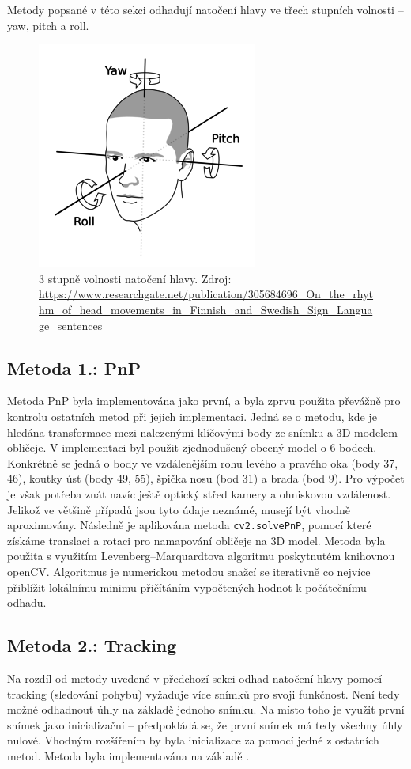 \documentclass[12pt,a4paper,titlepage,final]{report}
\begin{document}
Metody popsané v této sekci odhadují natočení hlavy ve třech stupních volnosti -- yaw, pitch a roll. 

\begin{figure}[H]
    \centering
    \includegraphics[scale=2]{images/yaw_pitch_roll.png}
    \caption{3 stupně volnosti natočení hlavy. Zdroj: \url{https://www.researchgate.net/publication/305684696_On_the_rhythm_of_head_movements_in_Finnish_and_Swedish_Sign_Language_sentences}}
    \label{fig:yaw_pitch_roll}
\end{figure}

\subsection{Metoda 1.: PnP}
Metoda PnP byla implementována jako první, a byla zprvu použita převážně pro kontrolu ostatních metod při jejich implementaci. Jedná se o metodu, kde je hledána transformace mezi nalezenými klíčovými body ze snímku a 3D modelem obličeje. V implementaci byl použit zjednodušený obecný model o 6 bodech. Konkrétně se jedná o body ve vzdálenějším rohu levého a pravého oka (body 37, 46), koutky úst (body 49, 55), špička nosu (bod 31) a brada (bod 9). Pro výpočet je však potřeba znát navíc ještě optický střed kamery a ohniskovou vzdálenost. Jelikož ve většině případů jsou tyto údaje neznámé, musejí být vhodně aproximovány. Následně je aplikována metoda \texttt{cv2.solvePnP}, pomocí které získáme translaci a rotaci pro namapování obličeje na 3D model. Metoda byla použita s využitím Levenberg–Marquardtova algoritmu poskytnutém knihovnou openCV. Algoritmus je numerickou metodou snažcí se iterativně co nejvíce přiblížit lokálnímu minimu přičítáním vypočtených hodnot k počátečnímu odhadu.
\subsection{Metoda 2.: Tracking}
Na rozdíl od metody uvedené v předchozí sekci odhad natočení hlavy pomocí tracking (sledování pohybu) vyžaduje více snímků pro svoji funkčnost. Není tedy možné odhadnout úhly na základě jednoho snímku. Na místo toho je využit první snímek jako inicializační -- předpokládá se, že první snímek má tedy všechny úhly nulové. Vhodným rozšířením by byla inicializace za pomocí jedné z ostatních metod. Metoda byla implementována na základě \cite{est_for_mobile}.
\end{document}
